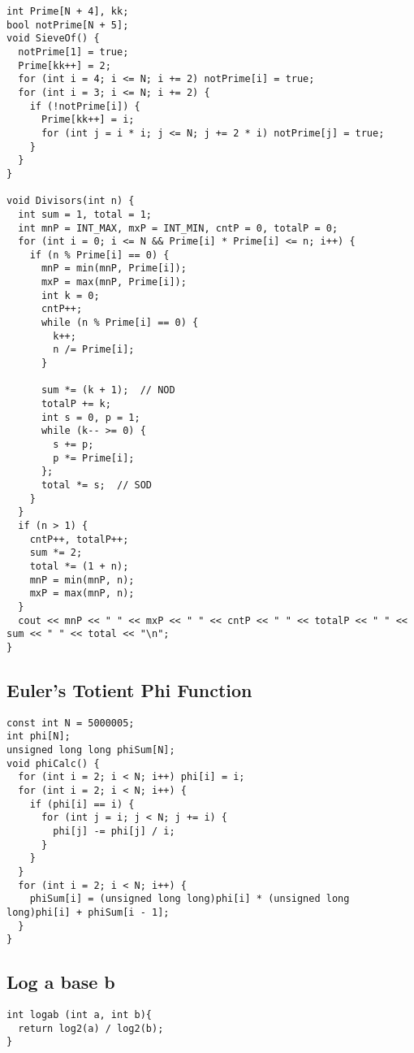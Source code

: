 \documentclass[10pt, a4paper]{article}
\begin{document}
\begin{multicols}{2}
\begin{lstlisting}
int Prime[N + 4], kk;
bool notPrime[N + 5];
void SieveOf() {
  notPrime[1] = true;
  Prime[kk++] = 2;
  for (int i = 4; i <= N; i += 2) notPrime[i] = true;
  for (int i = 3; i <= N; i += 2) {
    if (!notPrime[i]) {
      Prime[kk++] = i;
      for (int j = i * i; j <= N; j += 2 * i) notPrime[j] = true;
    }
  }
}

void Divisors(int n) {
  int sum = 1, total = 1;
  int mnP = INT_MAX, mxP = INT_MIN, cntP = 0, totalP = 0;
  for (int i = 0; i <= N && Prime[i] * Prime[i] <= n; i++) {
    if (n % Prime[i] == 0) {
      mnP = min(mnP, Prime[i]);
      mxP = max(mnP, Prime[i]);
      int k = 0;
      cntP++;
      while (n % Prime[i] == 0) {
        k++;
        n /= Prime[i];
      }

      sum *= (k + 1);  // NOD
      totalP += k;
      int s = 0, p = 1;
      while (k-- >= 0) {
        s += p;
        p *= Prime[i];
      };
      total *= s;  // SOD
    }
  }
  if (n > 1) {
    cntP++, totalP++;
    sum *= 2;
    total *= (1 + n);
    mnP = min(mnP, n);
    mxP = max(mnP, n);
  }
  cout << mnP << " " << mxP << " " << cntP << " " << totalP << " " << sum << " " << total << "\n";
}
\end{lstlisting}
\subsection{Euler's Totient Phi Function}
\begin{lstlisting}
const int N = 5000005;
int phi[N];
unsigned long long phiSum[N];
void phiCalc() {
  for (int i = 2; i < N; i++) phi[i] = i;
  for (int i = 2; i < N; i++) {
    if (phi[i] == i) {
      for (int j = i; j < N; j += i) {
        phi[j] -= phi[j] / i;
      }
    }
  }
  for (int i = 2; i < N; i++) {
    phiSum[i] = (unsigned long long)phi[i] * (unsigned long long)phi[i] + phiSum[i - 1];
  }
}
\end{lstlisting}
\subsection{Log a base b}
\begin{lstlisting}
int logab (int a, int b){
  return log2(a) / log2(b);
}
\end{lstlisting}
\end{multicols}
\end{document}
